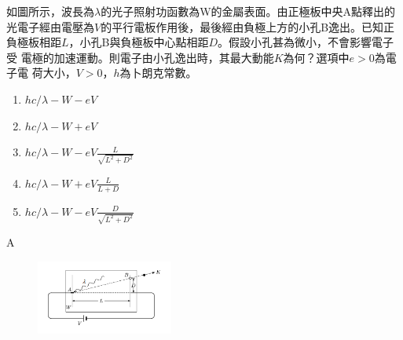 \documentclass[cn,10pt,math=newtx,chinesefont=founder]{elegantbook}
\begin{document}
\begin{example}
    如圖所示，波長為$\lambda$的光子照射功函數為W的金屬表面。由正極板㆗央A點釋出的
    光電子經由電壓為$V$的平行電板作用後，最後經由負極上方的小孔B逸出。已知正
    負極板相距$L$，小孔B與負極板㆗心點相距$D$。假設小孔甚為微小，不會影響電子受
    電極的加速運動。則電子由小孔逸出時，其最大動能$K$為何？選項㆗$e>0$為電子電
    荷大小，$V>0$，$h$為卜朗克常數。
    \begin{enumerate}[label=(\Alph*)]
        \item $hc/\lambda -W-eV$
        \item $hc/\lambda -W+eV$
        \item $hc/\lambda -W-eV\frac{L}{\sqrt{L^2+D^2}}$
        \item $hc/\lambda -W+eV\frac{L}{L+D}$
        \item $hc/\lambda -W-eV\frac{D}{\sqrt{L^2+D^2}}$
    \end{enumerate}
    \rightline{[92指考]}
\end{example}
\begin{solution}
    A
\end{solution}
\begin{figure}[htbp]
    \flushright
    \includegraphics[width=0.4\textwidth]{image/92_10.png}
\end{figure}
\newpage
\end{document}
